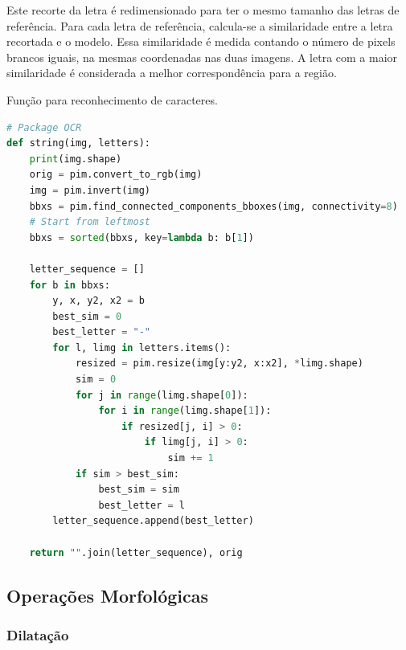 \documentclass[english, 
               brazil, 
               bsc] %
               {dcomp-abntex2}
\begin{document}
Este recorte da letra é redimensionado para ter o mesmo tamanho das letras de referência. Para cada letra de referência, calcula-se a similaridade entre a letra recortada e o modelo. Essa similaridade é medida contando o número de pixels brancos iguais, na mesmas coordenadas nas duas imagens. A letra com a maior similaridade é considerada a melhor correspondência para a região.


\begin{codigo}[h]
  \caption{\small Função para reconhecimento de caracteres.}
 \label{cod-ocr}
\begin{lstlisting}[language=python]
# Package OCR
def string(img, letters):
    print(img.shape)
    orig = pim.convert_to_rgb(img)
    img = pim.invert(img)
    bbxs = pim.find_connected_components_bboxes(img, connectivity=8)
    # Start from leftmost
    bbxs = sorted(bbxs, key=lambda b: b[1])

    letter_sequence = []
    for b in bbxs:
        y, x, y2, x2 = b
        best_sim = 0
        best_letter = "-"
        for l, limg in letters.items():
            resized = pim.resize(img[y:y2, x:x2], *limg.shape)
            sim = 0
            for j in range(limg.shape[0]):
                for i in range(limg.shape[1]):
                    if resized[j, i] > 0:
                        if limg[j, i] > 0:
                            sim += 1
            if sim > best_sim:
                best_sim = sim
                best_letter = l
        letter_sequence.append(best_letter)

    return "".join(letter_sequence), orig
\end{lstlisting}
\end{codigo}






\subsection{Operações Morfológicas}
\subsubsection{Dilatação}
\end{document}
